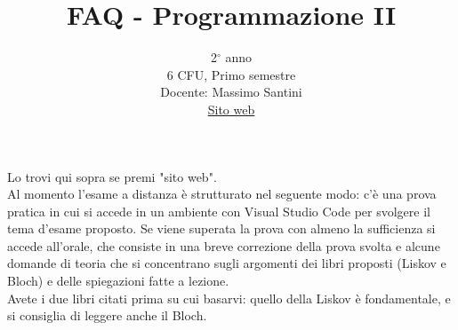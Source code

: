 \documentclass{article}
\title{FAQ - \textbf{Programmazione II}}
\date{}
\author{
	2$^{\circ}$ anno\\6 CFU, Primo semestre\\
	Docente: Massimo Santini\\ 
	\href{https://prog2.di.unimi.it/}{Sito web}
}
\begin{document}
 
	\maketitle
	
	\begin{enumerate}
		
		\rmfamily
		Lo trovi qui sopra se premi "sito web".\\
		
		Al momento l'esame a distanza è strutturato nel seguente modo: c'è una prova pratica in cui si accede
		in un ambiente con Visual Studio Code per svolgere il tema d'esame proposto. Se viene superata la prova
		con almeno la sufficienza si accede all'orale, che consiste in una breve correzione della prova svolta
		e alcune domande di teoria che si concentrano sugli argomenti dei libri proposti (Liskov e Bloch) e delle
		spiegazioni fatte a lezione.\\
		
		
		Avete i due libri citati prima su cui basarvi: quello della Liskov è fondamentale, e si consiglia
		di leggere anche il Bloch.\\
		
	\end{enumerate}
	
\end{document}
